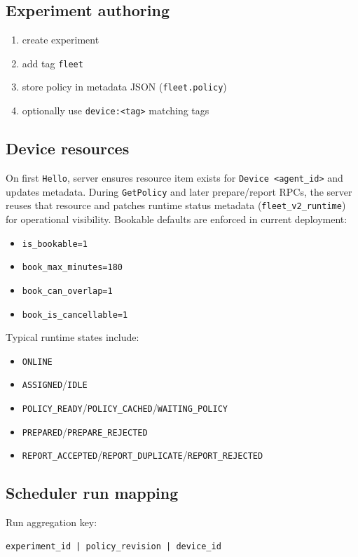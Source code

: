 \documentclass[11pt,a4paper]{article}
\begin{document}
\subsection{Experiment authoring}
\begin{enumerate}
  \item create experiment
  \item add tag \texttt{fleet}
  \item store policy in metadata JSON (\texttt{fleet.policy})
  \item optionally use \texttt{device:<tag>} matching tags
\end{enumerate}

\subsection{Device resources}
On first \texttt{Hello}, server ensures resource item exists for \texttt{Device <agent\_id>} and updates metadata.
During \texttt{GetPolicy} and later prepare/report RPCs, the server reuses that resource and patches runtime status metadata (\texttt{fleet\_v2\_runtime}) for operational visibility.
Bookable defaults are enforced in current deployment:
\begin{itemize}
  \item \texttt{is\_bookable=1}
  \item \texttt{book\_max\_minutes=180}
  \item \texttt{book\_can\_overlap=1}
  \item \texttt{book\_is\_cancellable=1}
\end{itemize}
Typical runtime states include:
\begin{itemize}
  \item \texttt{ONLINE}
  \item \texttt{ASSIGNED}/\texttt{IDLE}
  \item \texttt{POLICY\_READY}/\texttt{POLICY\_CACHED}/\texttt{WAITING\_POLICY}
  \item \texttt{PREPARED}/\texttt{PREPARE\_REJECTED}
  \item \texttt{REPORT\_ACCEPTED}/\texttt{REPORT\_DUPLICATE}/\texttt{REPORT\_REJECTED}
\end{itemize}

\subsection{Scheduler run mapping}
Run aggregation key:
\begin{verbatim}
experiment_id | policy_revision | device_id
\end{verbatim}
\end{document}
